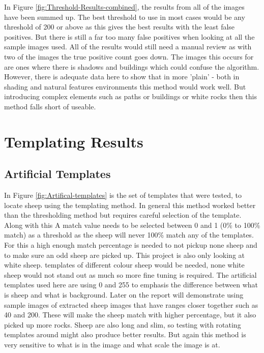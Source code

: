 In Figure \ref{fig:Threshold-Results-combined}, the results from all of the images have been summed up. The best threshold to use in most cases would be any threshold of 200 or above as this gives the best results with the least false positives. But there is still a far too many false positives when looking at all the sample images used. All of the results would still need a manual review as with two of the images the true positive count goes down. The images this occurs for are ones where there is shadows and buildings which could confuse the algorithm. However, there is adequate data here to show that in more 'plain' - both in shading and natural features environments this method would work well. But introducing complex elements such as paths or buildings or white rocks then this method falls short of useable.




\section{Templating Results}


\subsection{Artificial Templates}
In Figure \ref{fig:Artifical-templates} is the set of templates that were tested, to locate sheep using the templating method. In general this method worked better than the thresholding method but requires careful selection of the template. Along with this A match value needs to be selected between 0 and 1 (0\% to 100\% match) as a threshold as the sheep will never 100\% match any of the templates. For this a high enough match percentage is needed to not pickup none sheep and to make sure an odd sheep are picked up. This project is also only looking at white sheep. templates of different colour sheep would be needed, none white sheep would not stand out as much so more fine tuning is required. The artificial templates used here are using 0 and 255 to emphasis the difference between what is sheep and what is background. Later on the report will demonstrate using sample images of extracted sheep images that have ranges closer together such as 40 and 200. These will make the sheep match with higher percentage, but it also picked up more rocks. Sheep are also long and slim, so testing with rotating templates around might also produce better results. But again this method is very sensitive to what is in the image and what scale the image is at.

